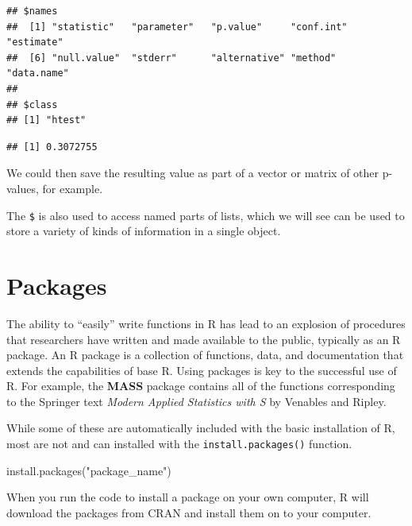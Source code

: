 \documentclass[
]{book}
\newenvironment{Shaded}{\begin{snugshade}}{\end{snugshade}}
\newcommand{\FunctionTok}[1]{\textcolor[rgb]{0.00,0.00,0.00}{#1}}
\newcommand{\NormalTok}[1]{#1}
\newcommand{\SpecialCharTok}[1]{\textcolor[rgb]{0.00,0.00,0.00}{#1}}
\newcommand{\StringTok}[1]{\textcolor[rgb]{0.31,0.60,0.02}{#1}}
\begin{document}
\begin{verbatim}
## $names
##  [1] "statistic"   "parameter"   "p.value"     "conf.int"    "estimate"   
##  [6] "null.value"  "stderr"      "alternative" "method"      "data.name"  
## 
## $class
## [1] "htest"
\end{verbatim}

\begin{Shaded}
\end{Shaded}

\begin{verbatim}
## [1] 0.3072755
\end{verbatim}

We could then save the resulting value as part of a vector or matrix of other p-values, for example.

The \texttt{\$} is also used to access named parts of lists, which we will see can be used to store a variety of kinds of information in a single object.

\hypertarget{packages}{%
\section{Packages}\label{packages}}

The ability to ``easily'' write functions in R has lead to an explosion of procedures that researchers have written and made available to the public, typically as an R package. An R package is a collection of functions, data, and documentation that extends the capabilities of base R. Using packages is key to the successful use of R. For example, the \textbf{MASS} package contains all of the functions corresponding to the Springer text \emph{Modern Applied Statistics with S} by Venables and Ripley.

While some of these are automatically included with the basic installation of R, most are not and can installed with the \texttt{install.packages()} function.

\begin{Shaded}
\begin{Highlighting}[]
\FunctionTok{install.packages}\NormalTok{(}\StringTok{"package\_name"}\NormalTok{)}
\end{Highlighting}
\end{Shaded}

When you run the code to install a package on your own computer, R will download the packages from CRAN and install them on to your computer.
\end{document}
